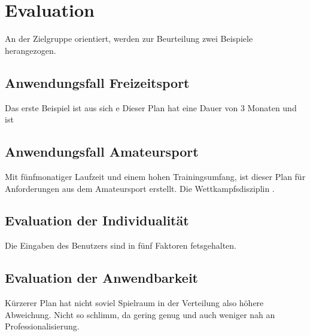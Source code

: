 \chapter{Evaluation}
\label{sec:evaluation}
An der Zielgruppe orientiert, werden zur Beurteilung zwei Beispiele herangezogen.
\section{Anwendungsfall Freizeitsport}
Das erste Beispiel ist aus sich e
Dieser Plan hat eine Dauer von 3 Monaten und ist 
\section{Anwendungsfall Amateursport}
Mit fünfmonatiger Laufzeit und einem hohen Trainingsumfang, ist dieser Plan für Anforderungen aus dem Amateursport erstellt. Die Wettkampfsdisziplin .

\section{Evaluation der Individualität}
Die Eingaben des Benutzers sind in fünf Faktoren fetsgehalten. 

\section{Evaluation der Anwendbarkeit}
Kürzerer Plan hat nicht soviel Spielraum in der Verteilung also höhere Abweichung. Nicht so schlimm, da gering genug und auch weniger nah an Professionalisierung.
